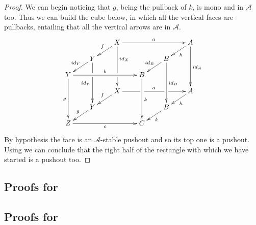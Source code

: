 \documentclass[a4paper,UKenglish,cleveref,pdftex, thm-restate,numberwithinsect]{lipics}
\newcommand{\id}[1]{\mathsf{id}_{#1}}
\def\Y{\textbf {\textup{Y}}}
\begin{document}
\begin{proof}
	We can begin noticing that $g$, being the pullback of $k$, is mono and in $\mathcal{A}$ too. Thus we can build the cube below, in which all the vertical faces are pullbacks, entailing that all the vertical arrows are in $\mathcal{A}$.
	\[\xymatrix@C=20pt@R=10pt{ & &X\ar[dl]_{f} \ar[ddd]^(.333333){\id{X}}|(.666666)\hole\ar[rrr]^{a} &&&A \ar[ddd]^{\id{A}} \ar[dl]^{h}\\& Y\ar[dl]_{\id{Y}} \ar[ddd]|(.333333)\hole_{\id{Y}} &&&B \ar[ddd]^{\id{B}} \ar[dl]_{\id{B}} \\Y \ar[ddd]_{g} \ar[rrr]^{b}&&& B\ar[ddd]^{k}\\&&X \ar[rrr]|(.34)\hole^{a}|(.67)\hole \ar[dl]_{f}&&& A \ar[dl]^{h}\\ & Y  \ar[dl]_{g}&&& B \ar[dl]^{k}\\ Z\ar[rrr]_{c} &&& C}\]
	By hypothesis the face is an $\mathcal{A}$-stable pushout and so its top one is a pushout. Using  we can conclude that the right half of the rectangle with which we have started is a pushout too.
\end{proof}

\subsection{Proofs for }


\printProofs[sec2]

\subsection{Proofs for }
\printProofs[sec3]
\end{document}
